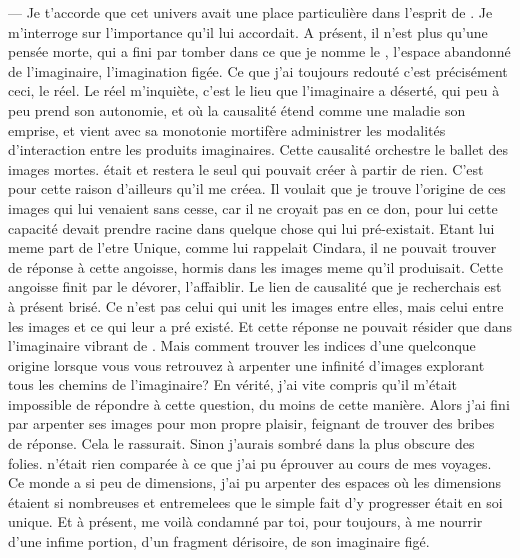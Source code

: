 --- Je t'accorde que cet univers avait une place particulière dans l'esprit de \Mey. Je m'interroge sur l'importance qu'il lui accordait. A présent, il n'est plus qu'une pensée morte, qui a fini par tomber dans ce que je nomme le \reel, l'espace abandonné de l'imaginaire, l'imagination figée.  Ce que j'ai toujours redouté c'est précisément ceci, le réel. Le réel m'inquiète, c'est le lieu que l'imaginaire a déserté, qui peu à peu prend son autonomie, et où la causalité étend comme une maladie son emprise, et vient avec sa monotonie mortifère administrer les modalités d'interaction entre les produits imaginaires. Cette causalité orchestre le ballet des images mortes. \Mey était et restera le seul qui pouvait créer à partir de rien. C'est pour cette raison d'ailleurs qu'il me créea. Il voulait que je trouve l'origine de ces images qui lui venaient sans cesse, car il ne croyait pas en ce don, pour lui cette capacité devait prendre racine dans quelque chose qui lui pré-existait. Etant lui meme part de l'etre Unique, comme lui rappelait Cindara, il ne pouvait trouver de réponse à cette angoisse, hormis dans les images meme qu'il produisait. Cette angoisse finit par le dévorer, l'affaiblir.   Le lien de causalité que je recherchais est à présent brisé. Ce n'est pas celui qui unit les images entre elles, mais celui entre les images et ce qui leur a pré existé. Et cette réponse ne pouvait résider que dans l'imaginaire vibrant de \Mey. Mais comment trouver les indices d'une quelconque origine lorsque vous vous retrouvez à arpenter une infinité d'images explorant tous les chemins de l'imaginaire? En vérité, j'ai vite compris qu'il m'était impossible de répondre à cette question, du moins de cette manière. Alors j'ai fini par arpenter ses images pour mon propre plaisir, feignant de trouver des bribes de réponse. Cela le rassurait. Sinon j'aurais sombré dans la plus obscure des folies.  \Auga n'était rien comparée à ce que j'ai pu éprouver au cours de mes voyages. Ce monde a si peu de dimensions, j'ai pu arpenter des espaces où les dimensions étaient si nombreuses et entremelees que le simple fait d'y progresser était en soi unique. Et à présent, me voilà condamné par toi,  pour toujours, à me nourrir d'une infime portion, d'un fragment dérisoire, de son imaginaire figé.


